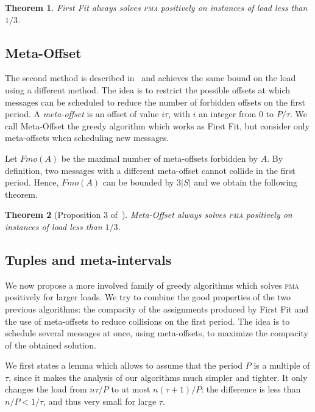 \documentclass[10pt, conference, letterpaper]{algotel}
\newtheorem{theorem}{Theorem}
\newcommand\pma{\textsc{pma}\xspace}
\begin{document}
\begin{theorem}
First Fit always solves \pma positively on instances of load less than $1/3$. 
\end{theorem}


\subsection{Meta-Offset}

The second method is described  in~\cite{dominique2018deterministic} and achieves the same bound on the load using a different method.
The idea is to restrict the possible offsets at which messages can be scheduled to reduce the number of forbidden offsets on the first period. A \emph{meta-offset} is an offset of value $i\tau$, with $i$ an integer from $0$ to $P / \tau$. We call Meta-Offset the greedy algorithm
which works as First Fit, but consider only meta-offsets when scheduling new messages. 

Let $Fmo(A)$ be the maximal number of meta-offsets forbidden by $A$. 
 By definition, two messages with a different meta-offset cannot collide in the first period.
Hence, $Fmo(A)$ can be bounded by $3|S|$ and we obtain the following theorem.


\begin{theorem}[Proposition 3 of~\cite{dominique2018deterministic}]
Meta-Offset always solves \pma positively on instances of load less than $1/3$.
\end{theorem}

\subsection{Tuples and meta-intervals}

We now propose a more involved family of greedy algorithms which 
solves \pma positively for larger loads. We try to combine the good properties of the two previous algorithms: the compacity of the assignments produced by First Fit and the use of meta-offsets to reduce collisions on the first period. The idea is to schedule several messages at once, using meta-offsets, to maximize the compacity of the obtained solution. 

We first states a lemma which allows to assume that the period $P$ is a multiple of $\tau$, since it makes the analysis of our algorithms much simpler and tighter. It only changes the load from $n \tau / P$ to at most $n (\tau +1)/ P$: the difference is less than $n /P < 1/\tau$, and thus very small for large $\tau$.
\end{document}
